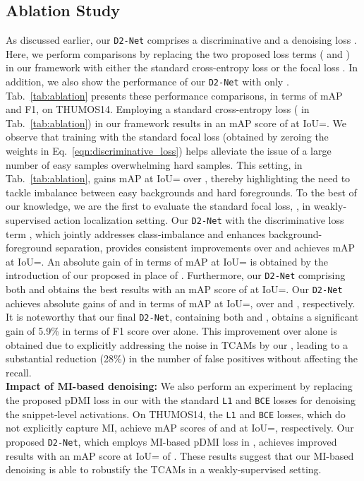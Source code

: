 \documentclass[final]{cvpr}
\def\proposed{\texttt{D2-Net}{}}
\begin{document}
\subsection{Ablation Study\label{sec:ablation}}
As discussed earlier, our \proposed{} comprises a discriminative  and a denoising loss . Here, we perform comparisons by replacing the two proposed loss terms ( and ) in our framework with either the standard cross-entropy loss  or the focal loss . In addition, we also show the performance of our \proposed{} with only . Tab.~\ref{tab:ablation} presents these performance comparisons, in terms of mAP and F1, on THUMOS14. Employing a standard cross-entropy loss ( in Tab.~\ref{tab:ablation}) in our framework results in an mAP score of  at IoU=. We observe that training with the standard focal loss (obtained by zeroing the weights  in Eq.~\ref{eqn:discriminative_loss}) helps alleviate the issue of a large number of easy samples overwhelming hard samples. This setting,  in Tab.~\ref{tab:ablation}, gains  mAP at IoU= over , thereby  highlighting the need to tackle imbalance between easy backgrounds and hard foregrounds. To the best of our knowledge, we are the first to evaluate the standard focal loss, , in weakly-supervised action localization setting.
Our \proposed{} with the discriminative loss term , which jointly addresses class-imbalance and enhances background-foreground separation, provides consistent improvements over  and achieves  mAP at IoU=. An absolute gain of  in terms of mAP at IoU= is obtained by the introduction of our proposed  in place of . Furthermore, our \proposed{} comprising both  and  obtains the best results with an mAP score of  at IoU=. Our  \proposed{} achieves absolute gains of  and  in terms of mAP at IoU=, over  and , respectively. It is noteworthy that our final \proposed{}, containing both   and , obtains a significant gain of 5.9\% in terms of F1 score over  alone. 
This improvement over  alone is obtained due to explicitly addressing the noise in TCAMs by our , leading to a substantial reduction (28\%) in the number of false positives without affecting the recall.   
\\
\noindent\textbf{Impact of MI-based denoising:} We also perform an experiment by replacing the proposed pDMI loss in our  with the standard \texttt{L1} and \texttt{BCE} losses for denoising the snippet-level activations. On THUMOS14, the \texttt{L1} and \texttt{BCE} losses, which do not explicitly capture MI, achieve mAP scores of  and  at IoU=, respectively. Our proposed \proposed{}, which employs MI-based pDMI loss in , achieves improved results with an mAP score at IoU= of . These results suggest that our MI-based denoising is able to robustify the TCAMs in a weakly-supervised setting. 
\end{document}
